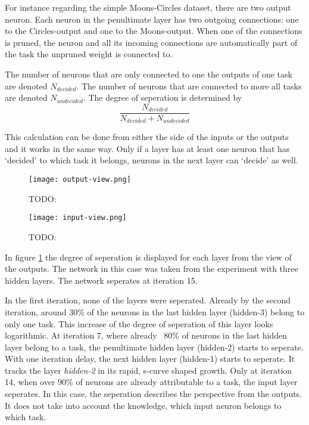 For instance regarding the simple Moons-Circles dataset, there are two output neuron.
Each neuron in the penultimate layer has two outgoing connections: one to the Circles-output and one to the Moons-output.
When one of the connections is pruned, the neuron and all its incoming connections are automatically part of the task the unpruned weight is connected to.

The number of neurons that are only connected to one the outputs of one task are denoted $N_{decided}$.
The number of neurons that are connected to more all tasks are denoted $N_{undecided}$.
The degree of seperation is determined by 
$$
\frac{N_{decided}}{N_{decided}+N_{undecided}}
$$

This calculation can be done from either the side of the inputs or the outputs and it works in the same way.
Only if a layer has at least one neuron that has `decided' to which task it belongs, neurons in the next layer can `decide' as well.

\begin{figure}[ht]
    \centering
    \texttt{[image: output-view.png]}
    \caption{TODO:}
    \label{fig:outview}
\end{figure}

\begin{figure}[ht]
    \centering
    \texttt{[image: input-view.png]}
    \caption{TODO:}
    \label{fig:inview}
\end{figure}

In figure \ref{fig:outview} the degree of seperation is displayed for each layer from the view of the outputs.
The network in this case was taken from the experiment with three hidden layers.
The network seperates at iteration 15.

In the first iteration, none of the layers were seperated.
Already by the second iteration, around $30$\% of the neurons in the last hidden layer (hidden-3) belong to only one task.
This increase of the degree of seperation of this layer looks logarithmic.
At iteration 7, where already ~$80$\% of neurons in the last hidden layer belong to a task, the penultimate hidden layer (hidden-2) starts to seperate.
With one iteration delay, the next hidden layer (hidden-1) starts to seperate.
It tracks the layer \textit{hidden-2} in its rapid, s-curve shaped growth.
Only at iteration 14, when over $90$\% of neurons are already attributable to a task, the input layer seperates.
In this case, the seperation describes the perspective from the outputs.
It does not take into account the knowledge, which input neuron belongs to which task.

